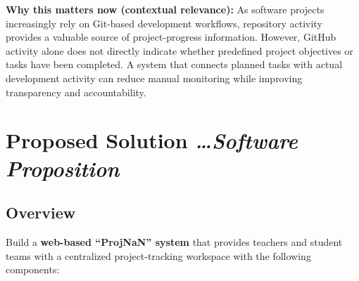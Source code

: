 \documentclass[11pt,a4paper]{article}
\newcommand{\BvrHint}[1]{%
  \texorpdfstring{%
    {\normalfont\normalsize\itshape\hfill #1}%
  }{}%
}
\begin{document}
\textbf{Why this matters now (contextual relevance):} As software projects increasingly rely on Git-based development workflows, repository activity provides a valuable source of project-progress information. However, GitHub activity alone does not directly indicate whether predefined project objectives or tasks have been completed. A system that connects planned tasks with actual development activity can reduce manual monitoring while improving transparency and accountability.


\section{Proposed Solution%
  \BvrHint{\ldots Software Proposition}}

\subsection{Overview}

Build a \textbf{web-based ``ProjNaN'' system} that provides teachers and student teams with a centralized project-tracking workspace with the following components:
\end{document}
